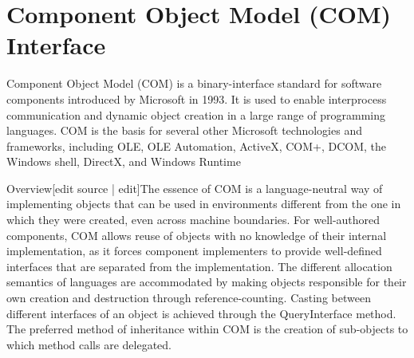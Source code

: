 	
	
	
	\chapter{Component Object Model (COM) Interface}
	\label{COMInterface}
	
	Component Object Model (COM) is a binary-interface standard for software components introduced by Microsoft in 1993. It is used to enable interprocess communication and dynamic object creation in a large range of programming languages. COM is the basis for several other Microsoft technologies and frameworks, including OLE, OLE Automation, ActiveX, COM+, DCOM, the Windows shell, DirectX, and Windows Runtime
	
	\vpara
	Overview[edit source | edit]The essence of COM is a language-neutral way of implementing objects that can be used in environments different from the one in which they were created, even across machine boundaries. For well-authored components, COM allows reuse of objects with no knowledge of their internal implementation, as it forces component implementers to provide well-defined interfaces that are separated from the implementation. The different allocation semantics of languages are accommodated by making objects responsible for their own creation and destruction through reference-counting. Casting between different interfaces of an object is achieved through the QueryInterface method. The preferred method of inheritance within COM is the creation of sub-objects to which method calls are delegated.
	
